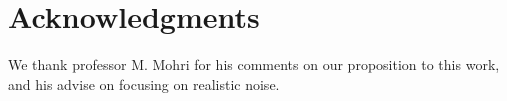 \section{Acknowledgments}
We thank professor M. Mohri for his comments on our proposition to this work, and his advise on focusing
on realistic noise.
